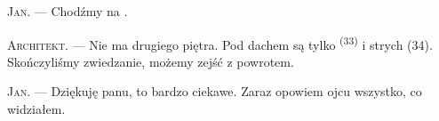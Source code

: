 \textsc{Jan}. --- Chodźmy na .

\textsc{Architekt}. --- Nie ma drugiego piętra. Pod dachem są tylko 
\textsuperscript{(33)} i strych (34). Skończyliśmy zwiedzanie, możemy zejść z powrotem.

\textsc{Jan}. --- Dziękuję panu, to bardzo ciekawe. Zaraz opowiem ojcu wszystko, co
widziałem.
\VUsaut{4.0mm}
\VUfilet{22mm}
